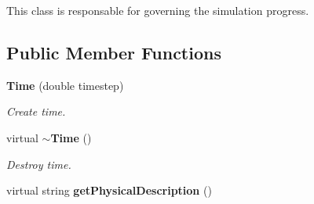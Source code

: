 This class is responsable for governing the simulation progress. \subsection*{Public Member Functions}
\begin{CompactItemize}
\item 
{\bf Time} (double timestep)\label{classTime_99767f8eeafc75912229851f484ac55a}

\begin{CompactList}\small\item\em Create time. \item\end{CompactList}\item 
virtual {\bf $\sim$Time} ()\label{classTime_daddb2dc46aa0b725cafe2e6cc8b8a5a}

\begin{CompactList}\small\item\em Destroy time. \item\end{CompactList}\item 
virtual string {\bf getPhysicalDescription} ()\label{classTime_1ac1a866153ab2dd80abf20b6e923909}


\end{CompactItemize}
